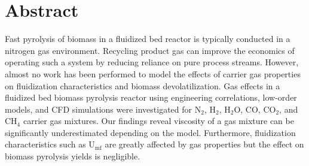 
\section*{Abstract}

Fast pyrolysis of biomass in a fluidized bed reactor is typically conducted in a nitrogen gas environment. Recycling product gas can improve the economics of operating such a system by reducing reliance on pure process streams. However, almost no work has been performed to model the effects of carrier gas properties on fluidization characteristics and biomass devolatilization. Gas effects in a fluidized bed biomass pyrolysis reactor using engineering correlations, low-order models, and CFD simulations were investigated for N$_2$, H$_2$, H$_2$O, CO, CO$_2$, and CH$_4$ carrier gas mixtures. Our findings reveal viscosity of a gas mixture can be significantly underestimated depending on the model. Furthermore, fluidization characteristics such as U$_\textrm{mf}$ are greatly affected by gas properties but the effect on biomass pyrolysis yields is negligible.

